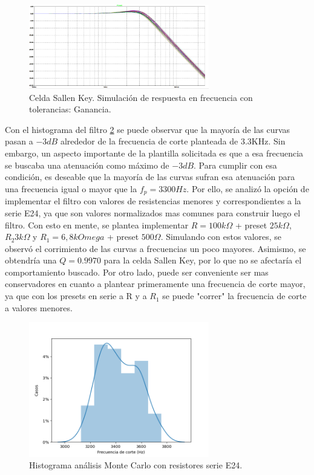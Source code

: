 \begin{figure}[H]
    \centering
        \includegraphics[width= 0.7\textwidth]{../Ejercicio2-DisenoDeCeldas/1CeldaSallenKey/images/SKsimu.png}
    \caption{Celda Sallen Key. Simulación de respuesta en frecuencia con tolerancias: Ganancia.}
    \label{fig:SKsimugain}
\end{figure}

Con el histograma del filtro \ref{fig:MCE96} se puede observar que la mayoría de las curvas pasan a $-3dB$ alrededor de la frecuencia de corte planteada de 3.3KHz. Sin embargo, un aspecto importante de la plantilla solicitada es que a esa frecuencia se buscaba una atenuación como máximo de $-3dB$. Para cumplir con esa condición, es deseable que la mayoría de las curvas sufran esa atenuación para una frecuencia igual o mayor que la $f_{p} = 3300Hz$. Por ello, se analizó la opción de implementar el filtro con valores de resistencias menores y correspondientes a la serie E24, ya que son valores normalizados mas comunes para construir luego el filtro. Con esto en mente, se plantea implementar $R=100k\Omega$ + preset $25k\Omega$, $R_{2}3k\Omega$ y $R_{1}=6,8kOmega$ + preset $500\Omega$. Simulando con estos valores, se observó el corrimiento de las curvas a frecuencias un poco mayores. Asimismo, se obtendría una $Q = 0.9970$ para la celda Sallen Key, por lo que no se afectaría el comportamiento buscado. Por otro lado, puede ser conveniente ser mas conservadores en cuanto a plantear primeramente una frecuencia de corte mayor, ya que con los presets en serie a R y a $R_{1}$ se puede "correr" la frecuencia de corte a valores menores. 

\begin{figure}[H]
    \centering
    \includegraphics[width= 0.7\textwidth]{../Ejercicio2-DisenoDeCeldas/1CeldaSallenKey/images/MCE24.png}
    \caption{Histograma análisis Monte Carlo con resistores serie E24.}
    \label{fig:MCE96}
\end{figure}

